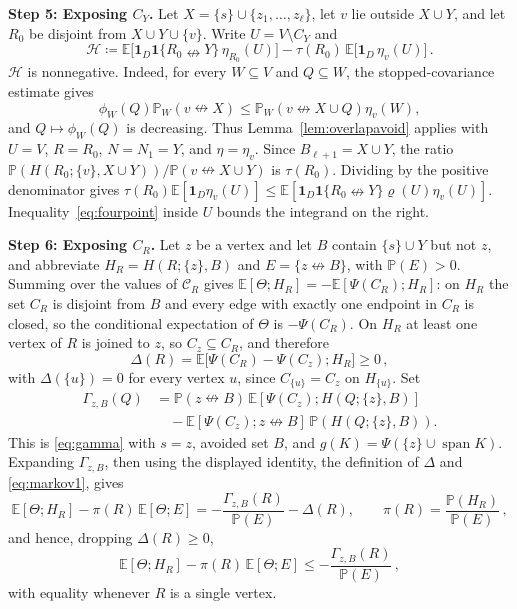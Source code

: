 \documentclass[11pt]{article}
\theoremstyle{definition}
\theoremstyle{remark}
\newcommand{\PP}{\mathbb P}
\newcommand{\EE}{\mathbb E}
\newcommand{\one}{\mathbf 1}
\newcommand{\ncon}{\nleftrightarrow}
\newcommand{\eC}{\mathcal C}
\DeclareMathOperator{\spn}{span}
\begin{document}
\medskip\noindent\textbf{Step 5: Exposing $C_Y$.}
Let $X=\{s\}\cup\{z_1,\dots,z_\ell\}$, let $v$ lie outside $X\cup Y$, and let $R_0$ be
disjoint from $X\cup Y\cup\{v\}$. Write $U=V\setminus C_Y$ and
\[
 \mathcal H\coloneqq\EE\bigl[\one_D\one\{R_0\ncon Y\}\,\eta_{R_0}(U)\bigr]
 -\tau(R_0)\,\EE\bigl[\one_D\,\eta_v(U)\bigr]\,.
\]
$\mathcal H$ is nonnegative. Indeed, for every $W\subseteq V$ and $Q\subseteq W$, the
stopped-covariance estimate gives
\[
 \phi_W(Q)\PP_W(v\ncon X)\leq
 \PP_W(v\ncon X\cup Q)\eta_v(W),
\]
and $Q\mapsto\phi_W(Q)$ is decreasing. Thus Lemma~\ref{lem:overlapavoid} applies with
$U=V$, $R=R_0$, $N=N_1=Y$, and $\eta=\eta_v$. Since $B_{\ell+1}=X\cup Y$, the ratio
$\PP(H(R_0;\{v\},X\cup Y))/\PP(v\ncon X\cup Y)$ is $\tau(R_0)$. Dividing by the positive
denominator gives
$\tau(R_0)\EE[\one_D\eta_v(U)]\leq
\EE[\one_D\one\{R_0\ncon Y\}\varrho(U)\eta_v(U)]$.
Inequality~\eqref{eq:fourpoint} inside $U$ bounds the integrand on the right.

\medskip\noindent\textbf{Step 6: Exposing $C_R$.}
Let $z$ be a vertex and let $B$ contain $\{s\}\cup Y$ but not $z$, and abbreviate
$H_R=H(R;\{z\},B)$ and $E=\{z\ncon B\}$, with $\PP(E)>0$. Summing over the values of
$\eC_R$ gives $\EE[\Theta;H_R]=-\EE[\Psi(C_R);H_R]$: on $H_R$ the set $C_R$ is disjoint
from $B$ and every edge with exactly one endpoint in $C_R$ is closed, so the conditional expectation of
$\Theta$ is $-\Psi(C_R)$. On $H_R$ at least one vertex of $R$ is joined to $z$, so
$C_z\subseteq C_R$, and therefore
\[
 \Delta(R)=\EE\bigl[\Psi(C_R)-\Psi(C_z);H_R\bigr]\geq 0\,,
\]
with $\Delta(\{u\})=0$ for every vertex $u$, since $C_{\{u\}}=C_z$ on $H_{\{u\}}$. Set
\[
\begin{split}
 \Gamma_{z,B}(Q)
 &=\PP(z\ncon B)\,
   \EE[\Psi(C_z);H(Q;\{z\},B)]\\
 &\quad-\EE[\Psi(C_z);z\ncon B]\,
   \PP(H(Q;\{z\},B)).
\end{split}
\]
This is \eqref{eq:gamma} with $s=z$, avoided set $B$, and
$g(K)=\Psi(\{z\}\cup\spn K)$. Expanding $\Gamma_{z,B}$, then using the
displayed identity, the definition of $\Delta$ and \eqref{eq:markov1}, gives
\begin{equation}\label{eq:cgdi}
 \EE[\Theta;H_R]-\pi(R)\,\EE[\Theta;E]=-\frac{\Gamma_{z,B}(R)}{\PP(E)}-\Delta(R),
 \qquad \pi(R)=\frac{\PP(H_R)}{\PP(E)}\,,
\end{equation}
and hence, dropping $\Delta(R)\ge0$,
\begin{equation}\label{eq:gdi}
 \EE[\Theta;H_R]-\pi(R)\,\EE[\Theta;E]\leq -\frac{\Gamma_{z,B}(R)}{\PP(E)}\,,
\end{equation}
with equality whenever $R$ is a single vertex.
\end{document}
